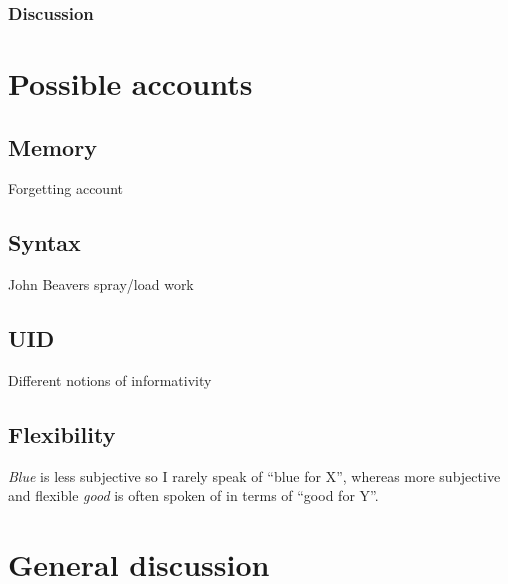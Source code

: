 \documentclass[11pt]{article}
\begin{document}
\subsubsection{Discussion}




\section{Possible accounts}


\subsection{Memory}

Forgetting account

\subsection{Syntax}

John Beavers spray/load work

\subsection{UID}

Different notions of informativity

\subsection{Flexibility}

\emph{Blue} is less subjective so I rarely speak of ``blue for X'', whereas more subjective and flexible \emph{good} is often spoken of in terms of ``good for Y''.


\section{General discussion}
\end{document}
